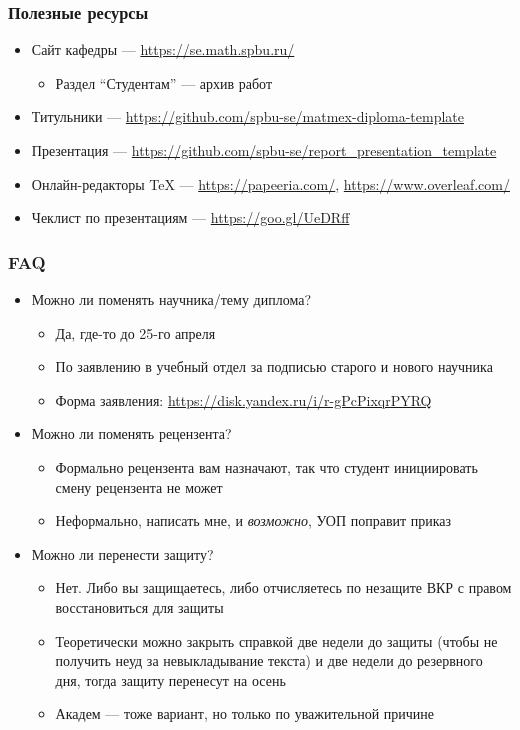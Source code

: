 \documentclass[xetex,mathserif,serif]{beamer}
\begin{document}
    \begin{frame}
        \frametitle{Полезные ресурсы}
        \begin{itemize}
            \item Сайт кафедры --- \url{https://se.math.spbu.ru/}
            \begin{itemize}
                \item Раздел \enquote{Студентам} --- архив работ
            \end{itemize}
            \item Титульники --- \url{https://github.com/spbu-se/matmex-diploma-template}
            \item Презентация --- \url{https://github.com/spbu-se/report_presentation_template}
            \item Онлайн-редакторы TeX --- \url{https://papeeria.com/}, \url{https://www.overleaf.com/}
            \item Чеклист по презентациям --- \url{https://goo.gl/UeDRff}
        \end{itemize}
    \end{frame}

    \begin{frame}
        \frametitle{FAQ}
        \begin{itemize}
            \item Можно ли поменять научника/тему диплома?
            \begin{itemize}
                \item Да, где-то до 25-го апреля
                \item По заявлению в учебный отдел за подписью старого и нового научника 
                \item Форма заявления: \url{https://disk.yandex.ru/i/r-gPcPixqrPYRQ}
            \end{itemize}
            \item Можно ли поменять рецензента?
            \begin{itemize}
                \item Формально рецензента вам назначают, так что студент инициировать смену рецензента не может
                \item Неформально, написать мне, и \textit{возможно}, УОП поправит приказ
            \end{itemize}
            \item Можно ли перенести защиту?
            \begin{itemize}
                \item Нет. Либо вы защищаетесь, либо отчисляетесь по незащите ВКР с правом восстановиться для защиты
                \item Теоретически можно закрыть справкой две недели до защиты (чтобы не получить неуд за невыкладывание текста) и две недели до резервного дня, тогда защиту перенесут на осень
                \item Академ --- тоже вариант, но только по уважительной причине
            \end{itemize}
        \end{itemize}
    \end{frame}
\end{document}
